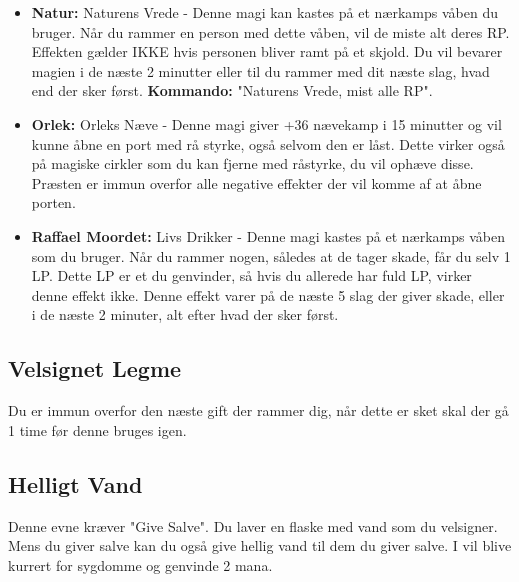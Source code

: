 \begin{itemize}
    \item \textbf{Natur:} Naturens Vrede - Denne magi kan kastes på et nærkamps våben du bruger. Når du rammer en person med dette våben, vil de miste alt deres RP. Effekten gælder IKKE hvis personen bliver ramt på et skjold. Du vil bevarer magien i de næste 2 minutter eller til du rammer med dit næste slag, hvad end der sker først. \textbf{Kommando:} "Naturens Vrede, mist alle RP".
    \item \textbf{Orlek:} Orleks Næve - Denne magi giver +36 nævekamp i 15 minutter og vil kunne åbne en port med rå styrke, også selvom den er låst. Dette virker også på magiske cirkler som du kan fjerne med råstyrke, du vil ophæve disse. Præsten er immun overfor alle negative effekter der vil komme af at åbne porten.
    \item \textbf{Raffael Moordet:} Livs Drikker -  Denne magi kastes på et nærkamps våben som du bruger. Når du rammer nogen, således at de tager skade, får du selv 1 LP. Dette LP er et du genvinder, så hvis du allerede har fuld LP, virker denne effekt ikke. Denne effekt varer på de næste 5 slag der giver skade, eller i de næste 2 minuter, alt efter hvad der sker først.
\end{itemize}

\subsection{Velsignet Legme}
Du er immun overfor den næste gift der rammer dig, når dette er sket skal der gå 1 time før denne bruges igen. 

\subsection{Helligt Vand}
Denne evne kræver "Give Salve". Du laver en flaske med vand som du velsigner. Mens du giver salve kan du også give hellig vand til dem du giver salve. I vil blive kurrert for sygdomme og genvinde 2 mana.
